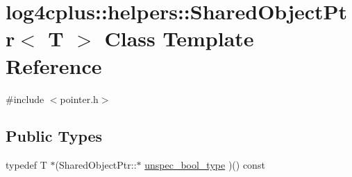 \hypertarget{classlog4cplus_1_1helpers_1_1SharedObjectPtr}{\section{log4cplus\-:\-:helpers\-:\-:Shared\-Object\-Ptr$<$ T $>$ Class Template Reference}
\label{classlog4cplus_1_1helpers_1_1SharedObjectPtr}
}


{\ttfamily \#include $<$pointer.\-h$>$}

\subsection*{Public Types}
\begin{DoxyCompactItemize}
\item 
typedef T $\ast$(Shared\-Object\-Ptr\-::$\ast$ \hyperlink{classlog4cplus_1_1helpers_1_1SharedObjectPtr_a653dc449b10d1397ace2fc3a14eebbe4}{unspec\-\_\-bool\-\_\-type} )() const 
\end{DoxyCompactItemize}
